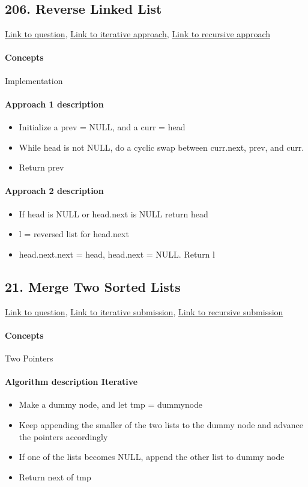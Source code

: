 \documentclass[11pt]{book}
\begin{document}
\subsection{206. Reverse Linked List}
\href{https://leetcode.com/problems/reverse-linked-list/}{Link to question},
\href{https://leetcode.com/submissions/detail/333870150/}{Link to iterative approach},
\href{https://leetcode.com/submissions/detail/333909164/}{Link to recursive approach}
\paragraph{Concepts}
Implementation
\paragraph{Approach 1 description}
\begin{itemize}
    \item Initialize a prev = NULL, and a curr = head
    \item While head is not NULL, do a cyclic swap between curr.next, prev, and curr.
    \item Return prev
\end{itemize}
\paragraph{Approach 2 description}
\begin{itemize}
    \item If head is NULL or head.next is NULL return head
    \item l = reversed list for head.next
    \item head.next.next = head, head.next = NULL. Return l
\end{itemize}

\subsection{21. Merge Two Sorted Lists}
\href{https://leetcode.com/problems/merge-two-sorted-lists/}{Link to question},
\href{https://leetcode.com/submissions/detail/334181938/}{Link to iterative submission},
\href{https://leetcode.com/submissions/detail/334165928/}{Link to recursive submission}
\paragraph{Concepts}
Two Pointers
\paragraph{Algorithm description Iterative}
\begin{itemize}
    \item Make a dummy node, and let tmp = dummynode
    \item Keep appending the smaller of the two lists to the dummy node and advance the pointers
        accordingly
    \item If one of the lists becomes NULL, append the other list to dummy node
    \item Return next of tmp
\end{itemize}
\end{document}
